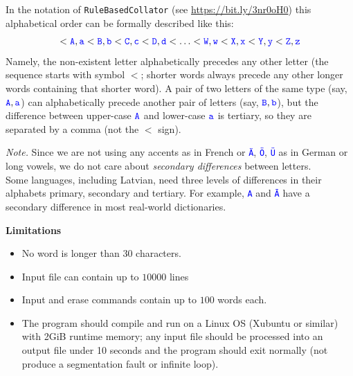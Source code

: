 \documentclass[11pt]{article}
\begin{document}
In the notation of {\tt RuleBasedCollator} (see \url{https://bit.ly/3nr0oH0}) this 
alphabetical order can be formally described like this:
$$< \textcolor{blue}{\mathtt{A}},\textcolor{blue}{\mathtt{a}} < \textcolor{blue}{\mathtt{B}},\textcolor{blue}{\mathtt{b}} < 
\textcolor{blue}{\mathtt{C}},\textcolor{blue}{\mathtt{c}} < \textcolor{blue}{\mathtt{D}},\textcolor{blue}{\mathtt{d}} < 
\ldots < \textcolor{blue}{\mathtt{W}},\textcolor{blue}{\mathtt{w}} < \textcolor{blue}{\mathtt{X}},\textcolor{blue}{\mathtt{x}} < 
\textcolor{blue}{\mathtt{Y}},\textcolor{blue}{\mathtt{y}} < \textcolor{blue}{\mathtt{Z}},\textcolor{blue}{\mathtt{z}}$$
Namely, the non-existent letter alphabetically precedes any other letter (the sequence starts with symbol $<$; shorter
words always precede any other longer words containing that shorter word).  
A pair of two letters of the same type (say, $\textcolor{blue}{\mathtt{A}},\textcolor{blue}{\mathtt{a}}$) 
can alphabetically precede another pair of letters (say, $\textcolor{blue}{\mathtt{B}},\textcolor{blue}{\mathtt{b}}$), 
but the difference between upper-case $\textcolor{blue}{\mathtt{A}}$ 
and lower-case $\textcolor{blue}{\mathtt{a}}$ is tertiary, so they are separated by a comma (not the $<$ sign).

{\em Note.} Since we are not using any accents as in French or \textcolor{blue}{\tt \"{A}}, \textcolor{blue}{\tt \"{O}}, 
\textcolor{blue}{\tt \"{U}} as in German or 
long vowels, we do not care about {\em secondary differences} between letters.\\
Some languages, including Latvian, need three levels of differences in their alphabets \textendash{} primary, secondary 
and tertiary. For example, \textcolor{blue}{\tt A} and \textcolor{blue}{\tt \=A} have a secondary difference
in most real-world dictionaries. 




\vspace{20pt}
{\bf \large Limitations}

\begin{itemize}
\item No word is longer than 30 characters. 
\item Input file can contain up to $10000$ lines
\item Input and erase commands 
contain up to $100$ words each.
\item The program should compile and run on a Linux OS (Xubuntu or similar) with 2GiB 
runtime memory; any input file should be processed into an output file under 
10 seconds and the program should exit normally (not produce a segmentation fault or 
infinite loop). 
\end{itemize}
\end{document}
